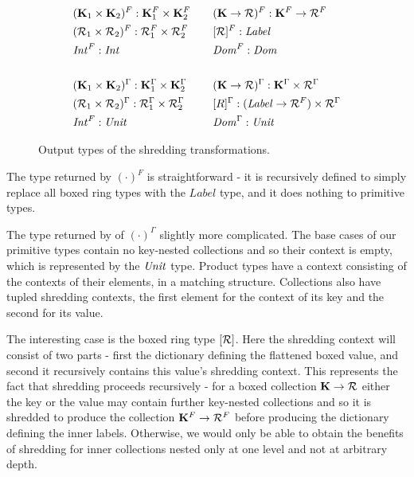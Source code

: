 {{{{\begin{figure}
\begin{equation*}
\begin{aligned}[c]
&(\mathbf{K}_1 \times \mathbf{K}_2)^F : \mathbf{K}_1^F \times \mathbf{K}_2^F \\
&(\mathcal{R}_1 \times \mathcal{R}_2)^F : \mathcal{R}_1^F \times \mathcal{R}_2^F \\
&\textrm{\textit{Int}}^F : \textrm{\textit{Int}} \\
\\
&(\mathbf{K}_1 \times \mathbf{K}_2)^\Gamma : \mathbf{K}_1^\Gamma \times \mathbf{K}_2^\Gamma \\
&(\mathcal{R}_1 \times \mathcal{R}_2)^\Gamma : \mathcal{R}_1^\Gamma \times \mathcal{R}_2^\Gamma \\
&\textrm{\textit{Int}}^F : \textrm{\textit{Unit}} \\
\end{aligned}
\qquad
\begin{aligned}[c]
&(\mathbf{K} \rightarrow \mathcal{R})^F : \mathbf{K}^F \rightarrow \mathcal{R}^F \\
&[\mathcal{R}]^F: \textrm{\textit{Label}} \\
&\textrm{\textit{Dom}}^F : \textrm{\textit{Dom}} \\
\\
&(\mathbf{K} \rightarrow \mathcal{R})^\Gamma : \mathbf{K}^\Gamma \times \mathcal{R}^\Gamma \\
&[R]^\Gamma : (\textrm{\textit{Label}} \rightarrow \mathcal{R}^F) \times \mathcal{R}^\Gamma \\
&\textrm{\textit{Dom}}^\Gamma : \textrm{\textit{Unit}} \\
\end{aligned}
\end{equation*}
\caption{Output types of the shredding transformations.}
\label{shreddingtypes}
\end{figure}

The type returned by $(\cdot)^F$ is straightforward - it is recursively defined to simply replace all boxed ring types with the $Label$ type, and it does nothing to primitive types.

The type returned by of $(\cdot)^\Gamma$ slightly more complicated. The base cases of our primitive types contain no key-nested collections and so their context is empty, which is represented by the $\textrm{\textit{Unit}}$ type. Product types have a context consisting of the contexts of their elements, in a matching structure. Collections also have tupled shredding contexts, the first element for the context of its key and the second for its value.

The interesting case is the boxed ring type $[\mathcal{R}]$. Here the shredding context will consist of two parts - first the dictionary defining the flattened boxed value, and second it recursively contains this value's shredding context. This represents the fact that shredding proceeds recursively - for a boxed collection $\mathbf{K} \rightarrow \mathcal{R}$ either the key or the value may contain further key-nested collections and so it is shredded to produce the collection $\mathbf{K}^F \rightarrow \mathcal{R}^F$ before producing the dictionary defining the inner labels. Otherwise, we would only be able to obtain the benefits of shredding for inner collections nested only at one level and not at arbitrary depth.

}}}}
